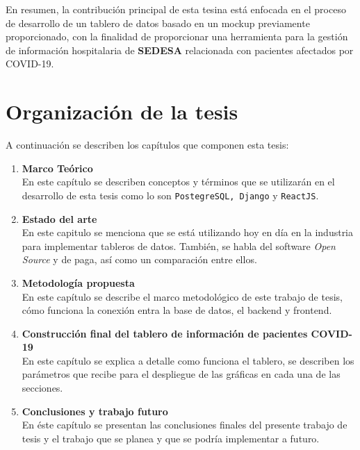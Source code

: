 En resumen, la contribución principal de esta tesina está enfocada en el proceso de desarrollo de un tablero de datos basado en un mockup previamente proporcionado, con la finalidad de proporcionar una herramienta para la gestión de información hospitalaria de \textbf{SEDESA} relacionada con pacientes afectados por COVID-19.





\section {Organización de la tesis}\label{intro_org}

A continuación se describen los capítulos que componen esta tesis:

\begin{enumerate}
    \item \textbf{Marco Teórico}\\
    En este capítulo se describen conceptos y términos que se utilizarán en el desarrollo de esta tesis como lo son \texttt{PostegreSQL, Django} y \texttt{ReactJS}.

    \item \textbf{Estado del arte}\\
    En este capitulo se menciona que se está utilizando hoy en día en la industria para implementar tableros de datos. También, se habla del software \textit{Open Source} y de paga, así como un comparación entre ellos. 

    \item \textbf{Metodología propuesta}\\
    En este capítulo se describe el marco metodológico de este trabajo de tesis, cómo funciona la conexión entra la base de datos, el backend y frontend.

    \item \textbf{Construcción final del tablero de información de pacientes COVID-19}\\
    En este capítulo se explica a detalle como funciona el tablero, se describen los parámetros que recibe para el despliegue de las gráficas en cada una de las secciones.
    
    \item \textbf{Conclusiones y trabajo futuro}\\
    En éste capítulo se presentan las conclusiones finales del presente trabajo de tesis y el trabajo que se planea y que se podría implementar a futuro.

\end{enumerate}

